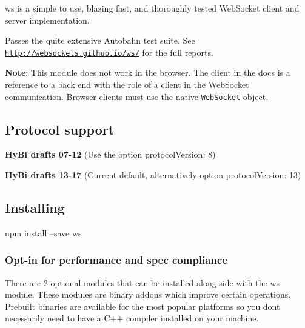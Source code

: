 \href{https://www.npmjs.com/package/ws}{\tt } \href{https://travis-ci.org/websockets/ws}{\tt } \href{https://ci.appveyor.com/project/lpinca/ws}{\tt } \href{https://coveralls.io/r/websockets/ws?branch=master}{\tt }

{\ttfamily ws} is a simple to use, blazing fast, and thoroughly tested Web\+Socket client and server implementation.

Passes the quite extensive Autobahn test suite. See \href{http://websockets.github.io/ws/}{\tt http\+://websockets.\+github.\+io/ws/} for the full reports.

{\bfseries Note}\+: This module does not work in the browser. The client in the docs is a reference to a back end with the role of a client in the Web\+Socket communication. Browser clients must use the native \href{https://developer.mozilla.org/en-US/docs/Web/API/WebSocket}{\tt {\ttfamily Web\+Socket}} object.

\subsection*{Protocol support}


\begin{DoxyItemize}
\item {\bfseries Hy\+Bi drafts 07-\/12} (Use the option {\ttfamily protocol\+Version\+: 8})
\item {\bfseries Hy\+Bi drafts 13-\/17} (Current default, alternatively option {\ttfamily protocol\+Version\+: 13})
\end{DoxyItemize}

\subsection*{Installing}


\begin{DoxyCode}
npm install --save ws
\end{DoxyCode}


\subsubsection*{Opt-\/in for performance and spec compliance}

There are 2 optional modules that can be installed along side with the {\ttfamily ws} module. These modules are binary addons which improve certain operations. Prebuilt binaries are available for the most popular platforms so you don\textquotesingle{}t necessarily need to have a C++ compiler installed on your machine.


